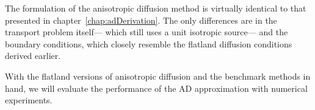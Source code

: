 The formulation of the anisotropic diffusion method is virtually identical to
that presented in chapter~\ref{chap:adDerivation}. The only differences are in
the transport problem itself---%
which still uses a unit isotropic source---%
and the boundary conditions, which closely resemble the flatland diffusion
conditions derived earlier.

With the flatland versions of anisotropic diffusion and the benchmark methods in
hand, we will evaluate the performance of the AD approximation with numerical
experiments.

